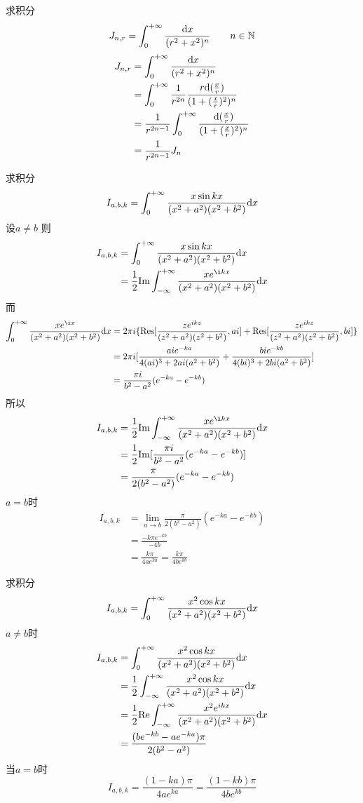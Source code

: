 \begin{homeworkProblem}
    求积分
    \[
    J_{n,r} = \int_0^{+\infty}\frac{\mathrm{d}x}{(r^2+x^2)^n} \qquad n\in\mathbb{N}
    \]
\solution
\[\begin{split}
J_{n,r} &= \int_0^{+\infty}\frac{\mathrm{d}x}{(r^2+x^2)^n}\\
&= \int_0^{+\infty} \frac{1}{r^{2n}}\frac{r\mathrm{d}(\frac{x}{r})}{(1+(\frac{x}{r})^2)^n}\\
&= \frac{1}{r^{2n-1}}\int_0^{+\infty}\frac{\mathrm{d}(\frac{x}{r})}{(1+(\frac{x}{r})^2)^n}\\
&= \frac{1}{r^{2n-1}}J_n
\end{split}\]
\end{homeworkProblem}
\begin{homeworkProblem}
    求积分
    \[
    I_{a,b,k} = \int_0^{+\infty}\frac{x\sin kx}{(x^2+a^2)(x^2+b^2)}\mathrm{d}x
    \]
\solution
设$a\neq b$
则
\[\begin{split}
I_{a,b,k} &= \int_0^{+\infty}\frac{x\sin kx}{(x^2+a^2)(x^2+b^2)}\dx\\
&= \frac{1}{2}\mathrm{Im}\int_{-\infty}^{+\infty}\frac{xe^{\i kx}}{(x^2+a^2)(x^2+b^2)}\dx
\end{split}\]
而
\[\begin{split}
\int_0^{+\infty}\frac{xe^{\i x}}{(x^2+a^2)(x^2+b^2)}\dx
&= 2\pi i\{\Res[\frac{ze^{ikz}}{(z^2+a^2)(z^2+b^2)}, ai] + \Res[\frac{ze^{ikz}}{(z^2+a^2)(z^2+b^2)}, bi]\}\\
&= 2\pi i [\frac{aie^{-ka}}{4(ai)^3+2ai(a^2+b^2)} + \frac{bie^{-kb}}{4(bi)^3+2bi(a^2+b^2)}]\\
&= \frac{\pi i}{b^2-a^2}(e^{-ka}-e^{-kb})
\end{split}\]
所以
\[\begin{split}
I_{a,b,k}
&= \frac{1}{2}\mathrm{Im}\int_{-\infty}^{+\infty}\frac{xe^{\i kx}}{(x^2+a^2)(x^2+b^2)}\dx\\
&= \frac{1}{2}\mathrm{Im}[\frac{\pi i}{b^2-a^2}(e^{-ka}-e^{-kb})]\\
&= \frac{\pi}{2(b^2-a^2)}(e^{-ka}-e^{-kb})
\end{split}\]
$a=b$时
\[\begin{split}
I_{a,b,k}
&= \lim_{a\rightarrow b}\frac{\pi}{2(b^2-a^2)}(e^{-ka}-e^{-kb}) \\
&= \frac{-k\pi e^{-kb}}{-4b} \\
&= \frac{k\pi}{4ae^{ka}} = \frac{k\pi}{4be^{kb}}
\end{split}\]
\end{homeworkProblem}
\begin{homeworkProblem}
    求积分
    \[
    I_{a,b,k} = \int_0^{+\infty}\frac{x^2\cos kx}{(x^2+a^2)(x^2+b^2)}\mathrm{d}x
    \]
\solution
$a\neq b$时
\[\begin{split}
I_{a,b,k} &= \int_0^{+\infty}\frac{x^2\cos kx}{(x^2+a^2)(x^2+b^2)}\mathrm{d}x\\
&= \frac{1}{2}\int_{-\infty}^{+\infty}\frac{x^2\cos kx}{(x^2+a^2)(x^2+b^2)}\mathrm{d}x\\
&= \frac{1}{2}\mathrm{Re}\int_{-\infty}^{+\infty}\frac{x^2e^{ikx}}{(x^2+a^2)(x^2+b^2)}\mathrm{d}x\\
&= \frac{(be^{-kb}-ae^{-ka})\pi}{2(b^2-a^2)}
\end{split}\]
当$a=b$时
\[I_{a,b,k} = \frac{(1-ka)\pi}{4ae^{ka}}= \frac{(1-kb)\pi}{4be^{kb}}\]
\end{homeworkProblem}

